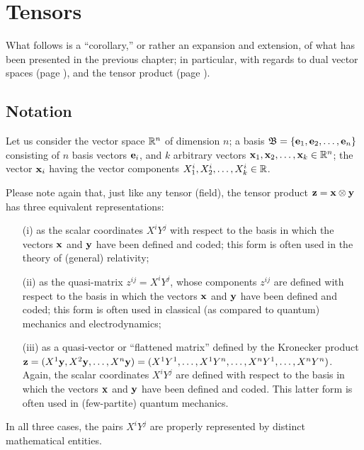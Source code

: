 \chapter{Tensors}
\label{ch:t}


What follows is a ``corollary,'' or rather an expansion and extension,
of what has been presented in the previous chapter; in particular, with regards to dual vector spaces
(page
\pageref{2011-m-dvs}),
and the tensor product
(page
\pageref{2011-m-tensorp}).

\section{Notation}

Let us consider the vector space ${\Bbb R}^n$ of dimension $n$;
a basis
${\mathfrak B}=\{{\bf e}_1,{\bf e}_2,\ldots ,{\bf e}_n\}$ consisting of
$n$ basis vectors ${\bf e}_i$,
and $k$ arbitrary vectors
${\bf x}_1,{\bf x}_2,\ldots ,{\bf x}_k\in {\Bbb R}^n$;
the vector ${\bf x}_i$ having the vector components
$X^i_1,X^i_2,\ldots ,X^i_k\in {\Bbb R}$.


Please note again that,
just like any tensor (field), the tensor product ${\bf z} = {\bf x} \otimes {\bf y}$     has three equivalent  representations:
\begin{itemize}
\item[(i)]
as the scalar coordinates $X^iY^j$ with respect to the basis in which the vectors ${\bf  x}$ and ${\bf y}$ have been defined and coded;
this form is often used in the theory of (general) relativity;
\item[(ii)]
as the quasi-matrix $z^{ij}  =X^iY^j$, whose components $z^{ij}$ are
defined with respect to the basis in which the vectors ${\bf  x}$ and ${\bf y}$ have been defined and coded;
this form is often used in classical (as compared to quantum) mechanics and electrodynamics;
\item[(iii)]
as a quasi-vector or ``flattened matrix'' defined by the Kronecker product
${\bf z} = (X^1  {\bf y}, X^2  {\bf y}, \ldots , X^n  {\bf y})=
(X^1  { Y}^1, \ldots ,X^1  { Y}^n, \ldots  ,X^n  { Y}^1, \ldots , X^n  { Y}^n)
$. Again, the scalar coordinates $X^iY^j$ are defined
with respect to the basis in which the vectors ${\bf  x}$ and ${\bf y}$ have been defined and coded.
This latter form is often used in (few-partite) quantum mechanics.
\end{itemize}
In all three cases, the pairs $X^iY^j$  are properly represented by distinct mathematical entities.


